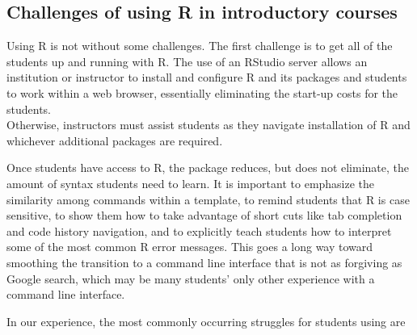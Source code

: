 \subsection{Challenges of using R in introductory
courses}\label{challenges-of-using-r-in-introductory-courses}

Using R is not without some challenges. The first challenge is to get
all of the students up and running with R. The use of an RStudio server
allows an institution or instructor to install and configure R and its
packages and students to work within a web browser, essentially
eliminating the start-up costs for the students.\\
Otherwise, instructors must assist students as they navigate
installation of R and whichever additional packages are required.

Once students have access to R, the  package reduces, but
does not eliminate, the amount of syntax students need to learn. It is
important to emphasize the similarity among commands within a template,
to remind students that R is case sensitive, to show them how to take
advantage of short cuts like tab completion and code history navigation,
and to explicitly teach students how to interpret some of the most
common R error messages. This goes a long way toward smoothing the
transition to a command line interface that is not as forgiving as
Google search, which may be many students' only other experience with a
command line interface.

In our experience, the most commonly occurring struggles for students
using  are

